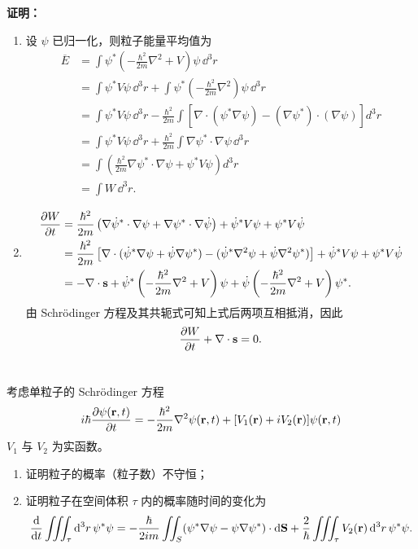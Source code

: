 \documentclass[10pt,a4paper]{article}
\begin{document}
\noindent\textbf{证明：} 
\begin{enumerate}[label=(\alph*)]
    \item 设 $\psi$ 已归一化，则粒子能量平均值为
    \begin{align*}
      \overline{E} &= \int \psi^*\left(-\frac{\hbar^2}{2m}\nabla^2 + V\right)\psi\, \dd^3r \\
      &= \int \psi^* V \psi\, \dd^3r + \int \psi^*\left(-\frac{\hbar^2}{2m}\nabla^2\right)\psi\, \dd^3r \\
      &= \int \psi^* V \psi\, \dd^3r -\frac{\hbar^2}{2m}\int \left[\nabla\cdot(\psi^*\nabla\psi) - (\nabla\psi^*)\cdot(\nabla\psi)\right] d^3r \\
      &= \int \psi^* V \psi\, \dd^3r + \frac{\hbar^2}{2m}\int \nabla\psi^*\cdot\nabla\psi\, \dd^3r \\
      &=\int \left(\frac{\hbar^2}{2m}\nabla\psi^*\cdot\nabla\psi + \psi^*V\psi\right)d^3r \\
      &= \int W\, \dd^3r.
    \end{align*}

    \item 
    \begin{align*}
      \pdv{W}{t} &= \frac{\hbar^2}{2m}\left(\nabla \dot{\psi}^* \cdot \nabla \psi + \nabla \psi^* \cdot \nabla \dot{\psi}\right) + \dot{\psi}^* V\psi + \psi^* V\dot{\psi} \\
      &= \frac{\hbar^2}{2m}\left[\nabla\cdot(\dot{\psi}^*\nabla\psi + \dot{\psi}\nabla\psi^*) - (\dot{\psi}^*\nabla^2\psi + \dot{\psi}\nabla^2\psi^*)\right] + \dot{\psi}^*V\psi + \psi^*V\dot{\psi} \\
      &= -\nabla\cdot\vb{s} + \dot{\psi}^*\left(-\frac{\hbar^2}{2m}\nabla^2 + V\right)\psi + \dot{\psi}\left(-\frac{\hbar^2}{2m}\nabla^2 + V\right)\psi^*.
    \end{align*}
    由 Schr\"odinger 方程及其共轭式可知上式后两项互相抵消，因此
    \[
    \pdv{W}{t} + \nabla\cdot\vb{s} = 0.
    \]
\end{enumerate}

\section{}
考虑单粒子的 Schr\"odinger 方程
\[
 i\hbar \pdv{\psi(\vb{r},t)}{t}
 = -\frac{\hbar^2}{2m}\nabla^2\psi(\vb{r},t)
 + [V_1(\vb{r})+iV_2(\vb{r})]\psi(\vb{r},t)
\]
$V_1$ 与 $V_2$ 为实函数。

\begin{enumerate}[label=(\alph*)]
    \item 证明粒子的概率（粒子数）不守恒；
    \item 证明粒子在空间体积 $\tau$ 内的概率随时间的变化为
    \[
    \dv{}{t}\iiint_\tau \dd^3r\, \psi^*\psi
    = -\frac{\hbar}{2im}\iint_S (\psi^*\nabla\psi - \psi\nabla\psi^*)\cdot \dd\vb{S}
    + \frac{2}{\hbar}\iiint_\tau V_2(\vb{r})\, \dd^3r\, \psi^*\psi.
    \]
\end{enumerate}
\end{document}
